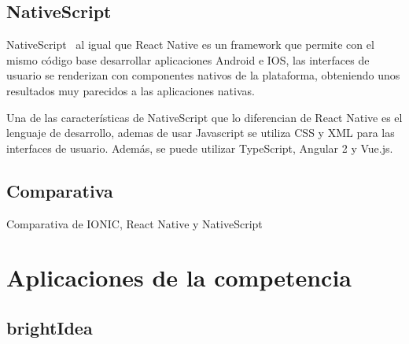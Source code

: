\subsection{NativeScript}

NativeScript~\cite{NATSCR} al igual que React Native es un framework que permite con el mismo código base desarrollar aplicaciones 
Android e IOS, las interfaces de usuario se renderizan con componentes nativos de la plataforma, obteniendo unos 
resultados muy parecidos a las aplicaciones nativas.

Una de las características de NativeScript que lo diferencian de React Native es el lenguaje de desarrollo, ademas de 
usar Javascript se utiliza CSS y XML para las interfaces de usuario. Además, se puede utilizar TypeScript, Angular 2 y
Vue.js.

\subsection{Comparativa}

\begin{table}[comparativa]
	\centering
	{\small
		
	}
	\caption[Comparativa de IONIC, React Native, NativeScript]
	{Comparativa de IONIC, React Native y NativeScript~\cite{comparativaHibridas}}
	\label{tab:comparativa}
\end{table}

\section{Aplicaciones de la competencia}
\subsection{brightIdea}


